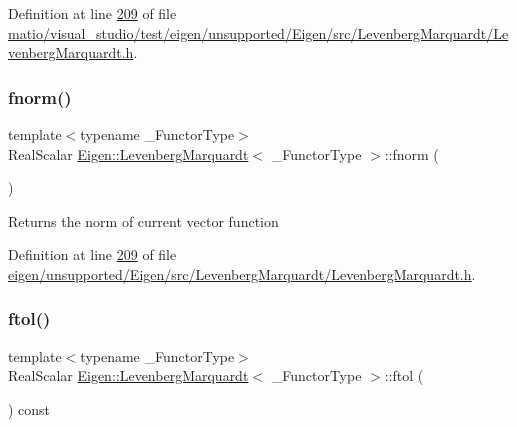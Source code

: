 Definition at line \hyperlink{matio_2visual__studio_2test_2eigen_2unsupported_2_eigen_2src_2_levenberg_marquardt_2_levenberg_marquardt_8h_source_l00209}{209} of file \hyperlink{matio_2visual__studio_2test_2eigen_2unsupported_2_eigen_2src_2_levenberg_marquardt_2_levenberg_marquardt_8h_source}{matio/visual\+\_\+studio/test/eigen/unsupported/\+Eigen/src/\+Levenberg\+Marquardt/\+Levenberg\+Marquardt.\+h}.

\mbox{\label{class_eigen_1_1_levenberg_marquardt_ac30c5ce96ac91663b287b2ba7ec7c712}} 
\subsubsection{\texorpdfstring{fnorm()}{fnorm()}\hspace{0.1cm}{\footnotesize\ttfamily [2/2]}}
{\footnotesize\ttfamily template$<$typename \+\_\+\+Functor\+Type$>$ \\
Real\+Scalar \hyperlink{class_eigen_1_1_levenberg_marquardt}{Eigen\+::\+Levenberg\+Marquardt}$<$ \+\_\+\+Functor\+Type $>$\+::fnorm (\begin{DoxyParamCaption}{ }\end{DoxyParamCaption})\hspace{0.3cm}{\ttfamily [inline]}}

\begin{DoxyReturn}{Returns}
the norm of current vector function 
\end{DoxyReturn}


Definition at line \hyperlink{eigen_2unsupported_2_eigen_2src_2_levenberg_marquardt_2_levenberg_marquardt_8h_source_l00209}{209} of file \hyperlink{eigen_2unsupported_2_eigen_2src_2_levenberg_marquardt_2_levenberg_marquardt_8h_source}{eigen/unsupported/\+Eigen/src/\+Levenberg\+Marquardt/\+Levenberg\+Marquardt.\+h}.

\mbox{\label{class_eigen_1_1_levenberg_marquardt_a957ac071ec775779bb03d10b463ddfbc}} 
\subsubsection{\texorpdfstring{ftol()}{ftol()}\hspace{0.1cm}{\footnotesize\ttfamily [1/2]}}
{\footnotesize\ttfamily template$<$typename \+\_\+\+Functor\+Type$>$ \\
Real\+Scalar \hyperlink{class_eigen_1_1_levenberg_marquardt}{Eigen\+::\+Levenberg\+Marquardt}$<$ \+\_\+\+Functor\+Type $>$\+::ftol (\begin{DoxyParamCaption}{ }\end{DoxyParamCaption}) const\hspace{0.3cm}{\ttfamily [inline]}}

